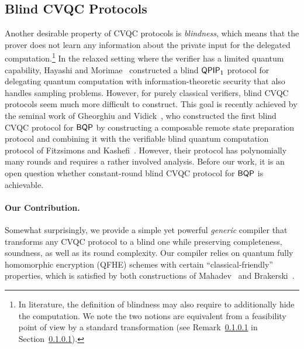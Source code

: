 







\subsection{Blind CVQC Protocols} \label{subsection:blind}



Another desirable property of CVQC protocols is  \emph{blindness}, which means that the prover does not learn any information about the private input for the delegated computation.\footnote{In literature, the definition of blindness may also require to additionally hide the computation. We note the two notions are equivalent from a feasibility point of view by a standard transformation (see Remark~\ref{} in Section~\ref{}). 
} In the relaxed setting where the verifier has a limited quantum capability, Hayashi and Morimae~\cite{hayashi2015verifiable} constructed a blind $\operatorname{\mathsf{QPIP}}_1$ protocol for delegating quantum computation with information-theoretic security that also handles sampling problems. 
%
However, for purely classical verifiers, blind CVQC protocols seem much more difficult to construct. This goal is recently achieved by the seminal work of Gheorghiu and Vidick~\cite{FOCS:GheVid19}, who constructed the first blind CVQC protocol for $\operatorname{\mathsf{BQP}}$ by constructing a composable remote state preparation protocol and combining it with the verifiable blind quantum computation protocol of Fitzsimons and Kashefi~\cite{FK17}. However, their protocol has   polynomially many rounds  and requires a rather involved analysis. Before our work, it is an open question whether constant-round blind CVQC protocol for $\operatorname{\mathsf{BQP}}$ is achievable.

\paragraph{Our Contribution.} Somewhat surprisingly, we provide a simple yet powerful  
\emph{generic}  compiler that transforms any CVQC protocol to a blind one while preserving completeness, soundness, as well as its round complexity. 
Our compiler relies on quantum fully homomorphic encryption (QFHE) schemes with certain ``classical-friendly'' properties, which is satisfied by both constructions of Mahadev~\cite{mahadev_qfhe} and Brakerski~\cite{??}.

